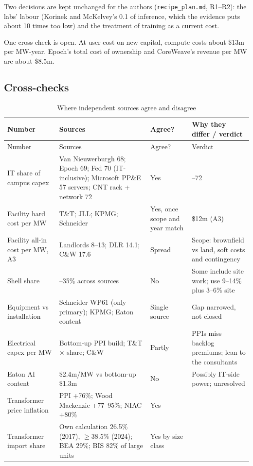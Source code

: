 Two decisions are kept unchanged for the authors (\texttt{recipe\_plan.md}, R1--R2): the labs'
labour (Korinek and McKelvey's 0.1 of inference, which the evidence puts about 10 times too low)
and the treatment of training as a current cost.

One cross-check is open. At user cost on new capital, compute costs about \$13m per MW-year.
Epoch's total cost of ownership and CoreWeave's revenue per MW are about \$8.5m.

\subsection{Cross-checks}

\begin{longtable}{>{\raggedright\arraybackslash}p{3.2cm}>{\raggedright\arraybackslash}p{5.6cm}>{\raggedright\arraybackslash}p{1.6cm}>{\raggedright\arraybackslash}p{4.0cm}}
\caption{Where independent sources agree and disagree}\label{tab:xcheck}\\
\toprule
Number & Sources & Agree? & Why they differ / verdict \\
\midrule\endfirsthead
\toprule
Number & Sources & Agree? & Verdict \\
\midrule\endhead
IT share of campus capex & Van Nieuwerburgh 68; Epoch 69; Fed 70 (IT-inclusive); Microsoft PP\&E 57 servers; CNT rack + network 72 & Yes & 68--72 \\
Facility hard cost per MW & T\&T; JLL; KPMG; Schneider & Yes, once scope and year match & \$12m (A3) \\
Facility all-in cost per MW, A3 & Landlords 8--13; DLR 14.1; C\&W 17.6 & Spread & Scope: brownfield vs land, soft costs and contingency \\
Shell share & 9--35\% across sources & No & Some include site work; use 9--14\% plus 3--6\% site \\
Equipment vs installation & Schneider WP61 (only primary); KPMG; Eaton content & Single source & Gap narrowed, not closed \\
Electrical capex per MW & Bottom-up PPI build; T\&T $\times$ share; C\&W & Partly & PPIs miss backlog premiums; lean to the consultants \\
Eaton AI content & \$2.4m/MW vs bottom-up \$1.3m & No & Possibly IT-side power; unresolved \\
Transformer price inflation & PPI +76\%; Wood Mackenzie +77--95\%; NIAC +80\% & Yes & \\
Transformer import share & Own calculation 26.5\% (2017), $\ge$38.5\% (2024); BEA 29\%; BIS 82\% of large units & Yes by size class & \\

\end{longtable}
